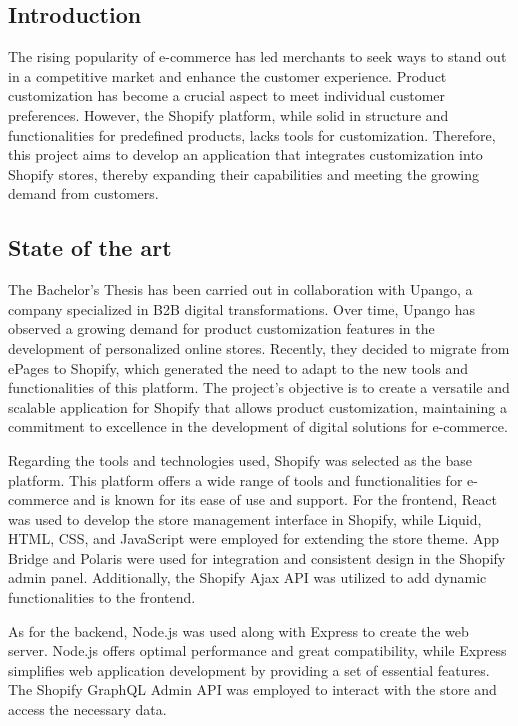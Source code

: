 \documentclass[11pt]{article}
\begin{document}
\subsection{Introduction}
The rising popularity of e-commerce has led merchants to seek ways to stand out in a competitive market and enhance the customer experience.
Product customization has become a crucial aspect to meet individual customer preferences. However, the Shopify platform, while solid in 
structure and functionalities for predefined products, lacks tools for customization. Therefore, this project aims to develop an application 
that integrates customization into Shopify stores, thereby expanding their capabilities and meeting the growing demand from customers.

\subsection{State of the art}
The Bachelor's Thesis has been carried out in collaboration with Upango, a company specialized in B2B digital transformations. Over time,
Upango has observed a growing demand for product customization features in the development of personalized online stores. Recently, they decided
to migrate from ePages to Shopify, which generated the need to adapt to the new tools and functionalities of this platform. The project's objective 
is to create a versatile and scalable application for Shopify that allows product customization, maintaining a commitment to excellence in the development
of digital solutions for e-commerce.

Regarding the tools and technologies used, Shopify was selected as the base platform. This platform offers a wide range of tools and functionalities 
for e-commerce and is known for its ease of use and support. For the frontend, React was used to develop the store management interface in Shopify, 
while Liquid, HTML, CSS, and JavaScript were employed for extending the store theme. App Bridge and Polaris were used for integration and consistent 
design in the Shopify admin panel. Additionally, the Shopify Ajax API was utilized to add dynamic functionalities to the frontend.

As for the backend, Node.js was used along with Express to create the web server. Node.js offers optimal performance and great compatibility, 
while Express simplifies web application development by providing a set of essential features. The Shopify GraphQL Admin API was employed to 
interact with the store and access the necessary data.
\end{document}

